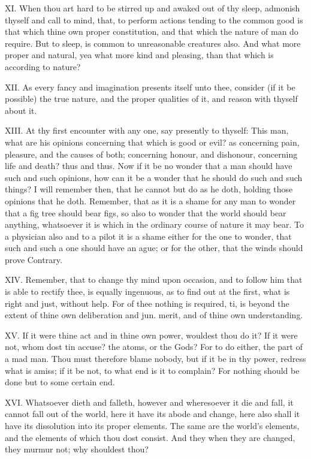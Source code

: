 XI. When thou art hard to be stirred up and awaked out of thy sleep,
admonish thyself and call to mind, that, to perform actions tending to the
common good is that which thine own proper constitution, and that which
the nature of man do require. But to sleep, is common to unreasonable
creatures also. And what more proper and natural, yea what more kind and
pleasing, than that which is according to nature?

XII. As every fancy and imagination presents itself unto thee, consider
(if it be possible) the true nature, and the proper qualities of it, and
reason with thyself about it.

XIII. At thy first encounter with any one, say presently to thyself:
This man, what are his opinions concerning that which is good or evil? as
concerning pain, pleasure, and the causes of both; concerning honour, and
dishonour, concerning life and death? thus and thus. Now if it be no
wonder that a man should have such and such opinions, how can it be a
wonder that he should do such and such things? I will remember then, that
he cannot but do as he doth, holding those opinions that he doth.
Remember, that as it is a shame for any man to wonder that a fig tree
should bear figs, so also to wonder that the world should bear anything,
whatsoever it is which in the ordinary course of nature it may bear. To a
physician also and to a pilot it is a shame either for the one to wonder,
that such and such a one should have an ague; or for the other, that the
winds should prove Contrary.

XIV. Remember, that to change thy mind upon occasion, and to follow him
that is able to rectify thee, is equally ingenuous, as to find out at the
first, what is right and just, without help. For of thee nothing is
required, ti, is beyond the extent of thine own deliberation and jun.
merit, and of thine own understanding.

XV. If it were thine act and in thine own power, wouldest thou do
it? If it were not, whom dost tin accuse? the atoms, or the Gods? For to
do either, the part of a mad man. Thou must therefore blame nobody, but if
it be in thy power, redress what is amiss; if it be not, to what end is it
to complain? For nothing should be done but to some certain end.

XVI. Whatsoever dieth and falleth, however and wheresoever it die
and fall, it cannot fall out of the world, here it have its abode and
change, here also shall it have its dissolution into its proper elements.
The same are the world's elements, and the elements of which thou dost
consist. And they when they are changed, they murmur not; why shouldest
thou?

